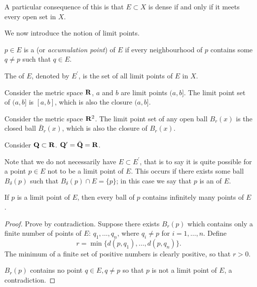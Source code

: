 \begin{remark}
A particular consequence of this is that $E\subset X$ is dense if and only if it meets every open set in $X$.
\end{remark}

We now introduce the notion of limit points.

\begin{definition}
$p\in E$ is a  (or \emph{accumulation point}) of $E$ if every neighbourhood of $p$ contains some $q\neq p$ such that $q\in E$.

The  of $E$, denoted by $E^\prime$, is the set of all limit points of $E$ in $X$.
\end{definition}

\begin{example}
Consider the metric space $\mathbf R$, $a$ and $b$ are limit points $(a,b]$. The limit point set of $(a,b]$ is $[a,b]$, which is also the closure $(a,b]$.

Consider the metric space $\mathbf R^2$. The limit point set of any open ball $B_r(x)$ is the closed ball $\bar{B}_r(x)$, which is also the closure of $B_r(x)$.

Consider $\mathbf Q\subset\mathbf R$. $\mathbf Q^\prime=\bar{\mathbf Q}=\mathbf R$.
\end{example}

Note that we do not necessarily have $E\subset E^\prime$, that is to say it is quite possible for a point $p\in E$ not to be a limit point of $E$. This occurs if there exists some ball $B_\delta(p)$ such that $B_\delta(p)\cap E=\{p\}$; in this case we say that $p$ is an  of $E$.

\begin{proposition}
If $p$ is a limit point of $E$, then every ball of $p$ contains infinitely many points of $E$.
\end{proposition}

\begin{proof}
Prove by contradiction. Suppose there exists $B_r(p)$ which contains only a finite number of points of $E$: $q_1,\dots,q_n$, where $q_i\neq p$ for $i=1,\dots,n$. Define
\[r=\min\{d(p,q_1),\dots,d(p,q_n)\}.\]
The minimum of a finite set of positive numbers is clearly positive, so that $r>0$.

$B_r(p)$ contains no point $q\in E,q\neq p$ so that $p$ is not a limit point of $E$, a contradiction.
\end{proof}

